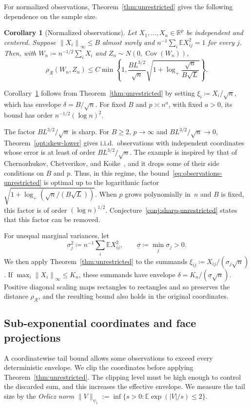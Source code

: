 \documentclass[11pt,letterpaper]{article}
\newtheorem{corollary}{Corollary}
\theoremstyle{remark}
\newcommand{\E}{\mathbb E}
\newcommand{\R}{\mathbb R}
\newcommand{\Cov}{\operatorname{Cov}}
\newcommand{\norm}[1]{\left\lVert#1\right\rVert}
\newcommand{\rh}{\rho_{\mathcal R}}
\begin{document}
For normalized observations, Theorem~\ref{thm:unrestricted} gives
the following dependence on the sample size.

\begin{corollary}[Normalized observations]\label{cor:observations}
Let \(X_1,\ldots,X_n\in\R^p\) be independent and centered. Suppose
\(\norm{X_i}_\infty\le B\) almost surely and
\(n^{-1}\sum_i\E X_{ij}^2=1\) for every \(j\). Then, with
\(W_n\coloneqq n^{-1/2}\sum_iX_i\) and \(Z_n\sim N(0,\Cov(W_n))\),
\begin{equation}
 \rh(W_n,Z_n)\le C\min\!\left\{1,
 \frac{B L^{3/2}}{\sqrt n}
 \sqrt{1+\log_+\frac{\sqrt n}{B\sqrt L}}\right\}.
 \label{eq:observations-unrestricted}
\end{equation}
\end{corollary}

Corollary~\ref{cor:observations} follows from Theorem~\ref{thm:unrestricted}
by setting \(\xi_i\coloneqq X_i/\sqrt n\), which has envelope \(\delta=B/\sqrt n\). For
fixed \(B\) and \(p\asymp n^a\), with fixed \(a>0\), its bound has
order \(n^{-1/2}(\log n)^2\).

The factor \(BL^{3/2}/\sqrt n\) is sharp. For \(B\ge2\), \(p\to\infty\) and
\(BL^{3/2}/\sqrt n\to0\), Theorem~\ref{opt:skew-lower} gives i.i.d.\ observations
with independent coordinates whose error is at least of order
\(BL^{3/2}/\sqrt n\). The example is inspired by that of Chernozhukov,
Chetverikov, and Koike~\cite[Proposition~2.1]{CCK}, and it drops some of their
side conditions on \(B\) and \(p\). Thus, in this regime, the
bound~\eqref{eq:observations-unrestricted} is optimal up to the logarithmic
factor \(\sqrt{1+\log_+(\sqrt n/(B\sqrt L))}\). When \(p\) grows polynomially
in~\(n\) and \(B\) is fixed, this factor is of order \((\log n)^{1/2}\).
Conjecture~\ref{conj:sharp-unrestricted} states that this factor can be removed.

For unequal marginal variances, let
\[
 \sigma_j^2\coloneqq n^{-1}\sum_i\E X_{ij}^2,
 \qquad
 \underline\sigma\coloneqq \min_j\sigma_j>0.
\]
We then apply Theorem~\ref{thm:unrestricted} to the summands
\(\xi_{ij}\coloneqq X_{ij}/(\sigma_j\sqrt n)\). If
\(\max_i\norm{X_i}_\infty\le K_n\), these summands have
envelope \(\delta=K_n/(\underline\sigma\sqrt n)\).
Positive diagonal scaling maps rectangles to rectangles and so preserves
the distance \(\rh\), and the resulting bound also holds in the
original coordinates.

\subsection{Sub-exponential coordinates and face projections}\label{sec:subexponential}
A coordinatewise tail bound allows some observations to exceed every
deterministic envelope. We clip the coordinates before applying
Theorem~\ref{thm:unrestricted}. The clipping level must be high enough
to control the discarded sum, and this increases the effective envelope.
We measure the tail size by the \emph{Orlicz norm}
\(\|V\|_{\psi_1}:=\inf\{s>0:\E\exp(|V|/s)\le2\}\).
\end{document}

